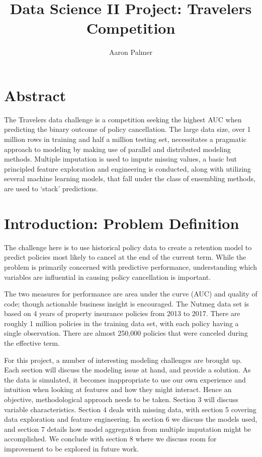 \documentclass[11pt]{article}
\title{Data Science II Project: Travelers Competition}
\author{Aaron Palmer} %
\theoremstyle{remark}
\theoremstyle{definition}
\begin{document}
\maketitle

\section{Abstract}
The Travelers data challenge is a competition seeking the highest AUC when predicting the binary outcome of policy cancellation. The large data size, over 1 million rows in training and half a million testing set, necessitates a pragmatic approach to modeling by making use of parallel and distributed modeling methods. Multiple imputation is used to impute missing values, a basic but principled feature exploration and engineering is conducted, along with utilizing several machine learning models, that fall under the class of ensembling methods, are used to `stack' predictions. 
\section{Introduction: Problem Definition}
The challenge here is to use historical policy data to create a retention model to predict policies most likely to cancel at the end of the current term. While the problem is primarily concerned with predictive performance, understanding which variables are influential in causing policy cancellation is important. 

The two measures for performance are area under the curve (AUC) and quality of code; though actionable business insight is encouraged. The Nutmeg data set is based on 4 years of property insurance policies from 2013 to 2017. There are roughly 1 million policies in the training data set, with each policy having a single observation. There are almost 250,000 policies that were canceled during the effective term.

For this project, a number of interesting modeling challenges are brought up. Each section will discuss the modeling issue at hand, and provide a solution.  As the data is simulated, it becomes inappropriate to use our own experience and intuition when looking at features and how they might interact. Hence an objective, methodological approach needs to be taken. Section 3 will discuss variable characteristics. Section 4 deals with missing data, with section 5 covering data exploration and feature engineering. In section 6 we discuss the models used, and section 7 details how model aggregation from multiple imputation might be accomplished. We conclude with section 8 where we discuss room for improvement to be explored in future work.
\end{document}
